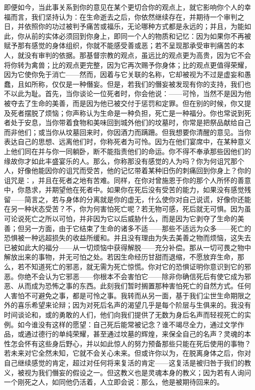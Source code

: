 即便如今，当此事关系到你的意见在某个更切合你的观点上，就它影响你个人的幸福而言，我们坚持认为：在生命逝去之后，你依然继续存在，并期待一个审判之日，并依照你的功过被判予痛苦或福乐，无论哪种方式都是永远的；并且，为能如此，你从前的实体必须回到你身上，即同一个人的物质和记忆：因为如果你不再被赋予那有感觉的身体组织，你就不能感受善或恶；若不呈现那承受审判痛苦的本人，就没有审判的依据。那基督宗教的观点，虽远比的观点更为高贵，因为它不会将你转为禽兽；比的观点更完整，因为它再次赐予你身体；比的观点更值得荣耀，因为它使你免于消亡——然而，因着与它关联的名称，它却被视为不过是虚妄和愚蠢，且如所称，仅仅是一种僭妄。但是，若我们的僭妄被发现有你的支持，我们也不以此为耻。首先，当你谈论一位死者时，你会他说：——可怜，当然不是因为他被夺去了生命的美善，而是因为他已被交付于惩罚和定罪。但在别的时候，你又提及死者摆脱了烦恼；你声称认为生命是一种负担，死亡是一种福分。你也常说到死者处于安息，当你带着食物和美味回到城外他们的坟墓时，你常是把祭品献给自己而非他们；或当你从坟墓回来时，你因酒力而蹒跚。但我想要你清醒的意见。当你表达自己的思想、远离他们时，你称死者为可怜。因为在他们宴席中，在某种意义上他们同在并与你一同躺卧，断不能指责他们的命运。你不得不奉承那些因他们的缘故你才如此丰盛宴乐的人。那么，你称那没有感觉的人为吗？你为何诅咒那个人，好像他能因你的诅咒而受苦，他的记忆带着某种旧伤的刺痛回到你身上？你的诅咒是：，并且在死者之地有苦难。同样，在你对曾施恩于你的那个人所怀的善意中，你恳求，并期望他在死者中。如果你在死后没有受苦的能力，如果没有感觉残留——简言之，若与身体的分离就是你的虚无，什么使你对自己说谎，好像你还能在另一种状态受苦？不，你为何害怕死亡呢？若无物可感，死后就无可惧。因为虽可论说死亡之所以可怕，并非因为它以后威胁什么，而是因为它剥夺了生命的美善；但另一方面，由于它结束了生命的诸多不适——那些不适远为众多——死亡的恐惧被一种远超损失的收益所缓和。并且没有理由为失去美善之物而烦恼，这失去已被如此大的福分——从一切烦恼中获得解脱——充分补偿。那从一切可畏之物中解放出来的事物，并无可怕之处。若因生命经历甘甜而退缩，不愿放弃生命，那么，若不知道死亡的邪恶，就无需为死亡惊慌。你对它的恐惧证明你意识到它的邪恶。你绝不会认为它邪恶——你根本不会害怕它——除非你确信死后有使它成为邪恶、从而成为恐怖之事的东西。此刻我们暂时搁置那种害怕死亡的自然方式。任何人害怕不可避免之事，都是可怜之事。我转而从另一面，基于我们尘世生命期限之外的喜乐希望来论辩；因为对死后名声的渴望几乎是每个阶层与生俱来的。我没有时间谈论和，或的勇敢的人们，他们向我们提供了无数为身后名声而轻视死亡的实例。如今谁没有这样的愿望：自己死后能常被记念？谁不竭尽全力，通过文学作品，或通过德行的单纯荣耀，甚至通过坟墓的辉煌，来保全自己的名声？灵魂的本性怎会怀有这些身后野心，并以如此惊人的努力预备那些只能在死后使用的事物？若未来对它全然未知，它就不会关心未来。但或许你以为，在脱离身体之后，你对自己继续感觉的肯定，超过对任何将来复活的肯定——这复活是被归咎于我们的教义，被视为我们僭妄的假设之一。但这教义也是灵魂本身的教义；因为若有人询问一个刚死之人，如同他仍活着，人立即会说：那么，他是被期待回来的。\par

